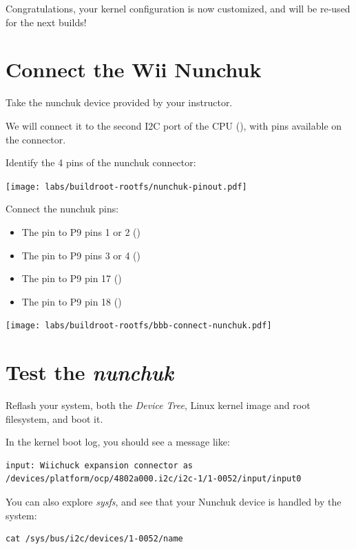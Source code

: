 Congratulations, your kernel configuration is now customized, and will
be re-used for the next builds!

\section{Connect the Wii Nunchuk}

Take the nunchuk device provided by your instructor.

We will connect it to the second I2C port of the CPU (),
with pins available on the  connector.

Identify the 4 pins of the nunchuk connector:

\begin{center}
\texttt{[image: labs/buildroot-rootfs/nunchuk-pinout.pdf]}
\end{center}

Connect the nunchuk pins:
\begin{itemize}
\item The  pin to P9 pins 1 or 2 ()
\item The  pin to P9 pins 3 or 4 ()
\item The  pin to P9 pin 17 ()
\item The  pin to P9 pin 18 ()
\end{itemize}

\begin{center}
\texttt{[image: labs/buildroot-rootfs/bbb-connect-nunchuk.pdf]}
\end{center}

\section{Test the {\em nunchuk}}

Reflash your system, both the {\em Device Tree}, Linux kernel image
and root filesystem, and boot it.

In the kernel boot log, you should see a message like:

\begin{verbatim}
input: Wiichuck expansion connector as /devices/platform/ocp/4802a000.i2c/i2c-1/1-0052/input/input0
\end{verbatim}

You can also explore {\em sysfs}, and see that your Nunchuk device is
handled by the system:

\begin{verbatim}
cat /sys/bus/i2c/devices/1-0052/name
\end{verbatim}

